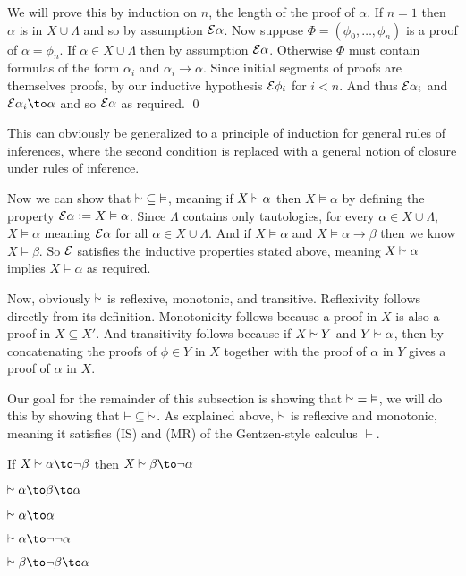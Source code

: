 \eprop

We will prove this by induction on $n$, the length of the proof of $\alpha$.
If $n=1$ then $\alpha$ is in $X\cup\Lambda$ and so by assumption ${\cal E}\alpha$.
Now suppose $\Phi=(\phi_0,\dots,\phi_n)$ is a proof of $\alpha=\phi_n$.
If $\alpha\in X\cup\Lambda$ then by assumption ${\cal E}\alpha$.
Otherwise $\Phi$ must contain formulas of the form $\alpha_i$ and $\alpha_i\to\alpha$.
Since initial segments of proofs are themselves proofs, by our inductive hypothesis ${\cal E}\phi_i$ for $i<n$.
And thus ${\cal E}\alpha_i$ and ${\cal E}\alpha_i\to\alpha$ and so ${\cal E}\alpha$ as required.
\qed

This can obviously be generalized to a principle of induction for general rules of inferences, where the second condition is replaced with a general notion of closure under rules of inference.

Now we can show that ${\vsim}\subseteq{\vDash}$, meaning if $X\vsim\alpha$ then $X\vDash\alpha$ by defining the property ${\cal E}\alpha\coloneqq X\vDash\alpha$.
Since $\Lambda$ contains only tautologies, for every $\alpha\in X\cup\Lambda$, $X\vDash\alpha$ meaning ${\cal E}\alpha$ for all $\alpha\in X\cup\Lambda$.
And if $X\vDash\alpha$ and $X\vDash\alpha\to\beta$ then we know $X\vDash\beta$.
So ${\cal E}$ satisfies the inductive properties stated above, meaning $X\vsim\alpha$ implies $X\vDash\alpha$ as required.

Now, obviously $\vsim$ is reflexive, monotonic, and transitive.
Reflexivity follows directly from its definition.
Monotonicity follows because a proof in $X$ is also a proof in $X\subseteq X'$.
And transitivity follows because if $X\vsim Y$ and $Y\vsim\alpha$, then by concatenating the proofs of $\phi\in Y$ in $X$ together with the proof of $\alpha$ in $Y$ gives a proof of $\alpha$ in $X$.

Our goal for the remainder of this subsection is showing that ${\vsim}={\vDash}$, we will do this by showing that ${\vdash}\subseteq{\vsim}$.
As explained above, $\vsim$ is reflexive and monotonic, meaning it satisfies (IS) and (MR) of the Gentzen-style calculus $\vdash$.

\blemm

    \benum
        \item If $X\vsim\alpha\to\neg\beta$ then $X\vsim\beta\to\neg\alpha$
        \item $\vsim\alpha\to\beta\to\alpha$
        \item $\vsim\alpha\to\alpha$
        \item $\vsim\alpha\to\neg\neg\alpha$
        \item $\vsim\beta\to\neg\beta\to\alpha$
    \eenum

